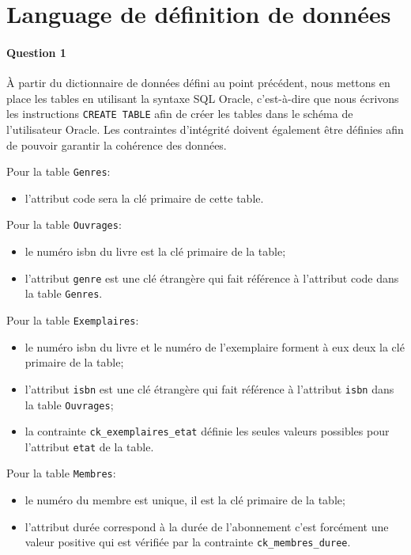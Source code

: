 \documentclass[10pt, oneside]{article}
\begin{document}
\section{Language de définition de données}


\paragraph{Question 1} À partir du dictionnaire de données défini au point précédent, nous mettons en place les tables en utilisant la syntaxe SQL Oracle, c'est-à-dire que nous écrivons les instructions \texttt{CREATE TABLE} afin de créer les tables dans le schéma de l'utilisateur Oracle. Les contraintes d'intégrité doivent également être définies afin de pouvoir garantir la cohérence des données.

Pour la table \texttt{Genres}: 
\begin{itemize}
\item l'attribut code sera la clé primaire de cette table.
\end{itemize}

Pour la table \texttt{Ouvrages}: 
\begin{itemize}
\item le numéro isbn du livre est la clé primaire de la table;
\item l'attribut \texttt{genre} est une clé étrangère qui fait référence à l'attribut code dans la table \texttt{Genres}.
\end{itemize}

Pour la table \texttt{Exemplaires}: 
\begin{itemize}
\item le numéro isbn du livre et le numéro de l'exemplaire forment à eux deux la clé primaire de la table;
\item l'attribut \texttt{isbn} est une clé étrangère qui fait référence à l'attribut \texttt{isbn} dans la table \texttt{Ouvrages};
\item la contrainte \texttt{ck\_exemplaires\_etat} définie les seules valeurs possibles pour l'attribut \texttt{etat} de la table.
\end{itemize}

Pour la table \texttt{Membres}: 
\begin{itemize}
\item le numéro du membre est unique, il est la clé primaire de la table;
\item l'attribut durée correspond à la durée de l'abonnement c'est forcément une valeur positive qui est vérifiée par la contrainte \texttt{ck\_membres\_duree}.
\end{itemize}
\end{document}
